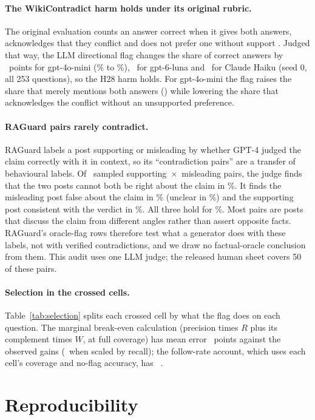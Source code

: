 \paragraph{The WikiContradict harm holds under its original rubric.} The original evaluation counts an answer correct when it gives
both answers, acknowledges that they conflict and does not prefer one without support
\citep[\S3.4]{hou2024wikicontradict}. Judged that way, the LLM directional flag changes the share of correct answers
by \wikiOrigMiniEff\ points for gpt-4o-mini (\wikiOrigMiniPlain\% to \wikiOrigMiniDir\%), \wikiOrigLunaEff\ for
gpt-6-luna and \wikiOrigHaikuEff\ for Claude Haiku (seed 0, all 253 questions), so the H28 harm holds. For gpt-4o-mini the flag raises the share that merely mentions both answers (\wikiBothMiniEff) while
lowering the share that acknowledges the conflict without an unsupported preference.

\paragraph{RAGuard pairs rarely contradict.} RAGuard labels a post supporting or misleading by whether GPT-4 judged the claim correctly
with it in context, so its ``contradiction pairs'' are a transfer of behavioural labels. Of \rgAudN\ sampled
supporting~$\times$~misleading pairs, the judge finds that the two posts cannot both be right about the claim in
\rgAudContradict\%. It finds the misleading post false about the claim in \rgAudBFalse\% (unclear in
\rgAudBUnclear\%) and the supporting post consistent with the verdict in \rgAudASupports\%. All three hold for
\rgAudVerified\%. Most pairs are posts that discuss the claim from different angles rather than assert opposite
facts. RAGuard's oracle-flag rows therefore test what a generator does with these labels, not with verified
contradictions, and we draw no factual-oracle conclusion from them. This audit uses one LLM judge; the released
human sheet covers 50 of these pairs.


\paragraph{Selection in the crossed cells.} Table~\ref{tab:selection} splits each crossed cell by what the flag does
on each question. The marginal break-even calculation (precision times $R$ plus its complement times $W$, at full
coverage) has mean error \selMargMae\ points against the observed gains (\selMargCovMae\ when scaled by recall); the
follow-rate account, which uses each cell's coverage and no-flag accuracy, has \predEightMae\ \predEightMaeCI.

\section{Reproducibility}